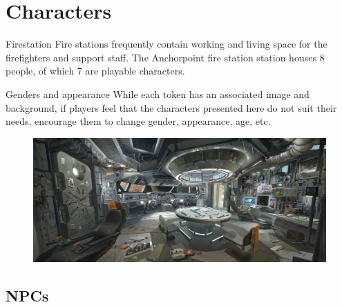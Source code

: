 \chapter{Characters}


\begin{rpg-commentbox}{Firestation}
    Fire stations frequently contain working and living space for the firefighters and support staff. The Anchorpoint fire station station houses 8 people, of which 7 are playable characters.
\end{rpg-commentbox}

\begin{rpg-warnbox}{Genders and appearance}
    While each token has an associated image and background, if players feel that the characters presented here do not suit their needs, encourage them to change gender, appearance, age, etc. 
\end{rpg-warnbox}

\begin{figure}
    \centering
    \includegraphics[width=.45\textwidth]{img/bg/fire-station.jpg}
\end{figure}





\clearpage


\section{NPCs}




